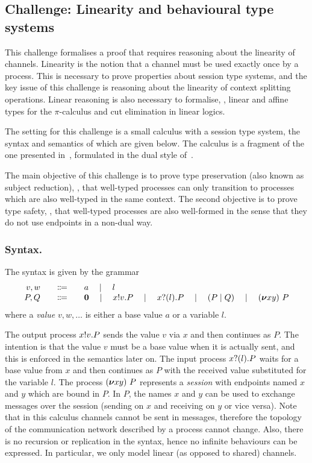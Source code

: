 \subsection{Challenge: Linearity and behavioural type systems}
\label{sec:challenge:linearity-beh-types}
This challenge formalises a proof that requires reasoning about the linearity of channels.
Linearity is the notion that a channel must be used exactly once by a process.
This is necessary to prove properties about session type systems, and the key
issue of this challenge is reasoning about the linearity of context splitting operations.
Linear reasoning is also necessary to formalise, \eg, linear and affine types for the \(\pi\)-calculus and cut elimination in linear logics.

The setting for this challenge is a small calculus with a session type
system, the syntax and semantics of which are given below. The
calculus is a fragment of the one presented in~\cite{Vasconcelos2012},
formulated in the dual style of~\cite{barber96tr}.

The main objective of this challenge is to prove type preservation (also
known as subject reduction), \ie, that well-typed
processes can only transition to processes which are also well-typed
in the same context.
The second objective is to prove type safety, \ie, that well-typed processes are also well-formed in the sense that they do not use endpoints in a non-dual way.

\subsubsection{Syntax.}
The syntax is given by the grammar
\[
\begin{array}{r@{\qquad}c@{\qquad}l}
  v,w & \Coloneqq & a \quad\mid\quad l \\
   P,Q & \Coloneqq & \Pend \quad\mid\quad \Pout{x}{v}{P} \quad\mid\quad \Pin{x}{l}{P} \quad\mid\quad \PBpar{P}{Q} \quad\mid\quad  \Presd{x}{y}{P}
\end{array}
\]
where a \emph{value} \( v, w, \dots \) is either a base value \( a \) or a variable \( l \).

The output process \( x ! v . P \) sends the value \( v \) via \( x \) and then continues as \( P \).
The intention is that the value \( v \) must be a base value when it is actually sent, and this is enforced in the semantics later on.
The input process \( x ? (l) . P \) waits for a base value from \( x \) and then continues as \( P \) with the received value substituted for the variable \( l \).
%
The process \( (\bm{\nu} xy)~P \) represents a \emph{session} with endpoints named \( x \) and \( y \) which are bound in \( P \). In \( P \), the names \( x \) and \( y \) can be used to exchange messages over the session (sending on \( x \) and receiving on \( y \) or vice versa).
%
%
Note that in this calculus channels cannot be sent in messages, therefore the topology of the communication network described by a process cannot change.
Also, there is no recursion or replication in the syntax, hence no infinite behaviours can be expressed. In particular, we only model linear (as opposed to shared) channels.

